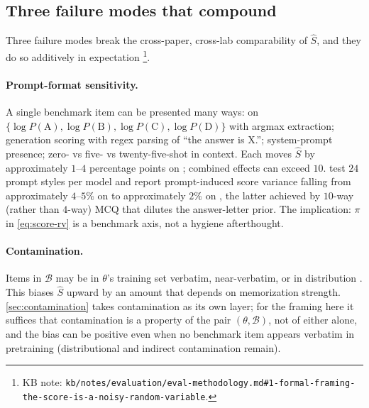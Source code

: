 \subsection{Three failure modes that compound}
\label{sec:measuring-failure-modes}

Three failure modes break the cross-paper, cross-lab comparability of
$\hat{S}$, and they do so additively in expectation%
\footnote{KB note: \texttt{kb/notes/evaluation/eval-methodology.md\#1-formal-framing-the-score-is-a-noisy-random-variable}.}.

\paragraph{Prompt-format sensitivity.} A single benchmark item can be
presented many ways:  on
$\{\log P(\text{A}), \log P(\text{B}), \log P(\text{C}), \log P(\text{D})\}$
with argmax extraction; generation scoring with regex parsing of
``the answer is X.''; system-prompt presence; zero- vs five- vs
twenty-five-shot in context. Each moves $\hat{S}$ by approximately
$1$--$4$ percentage points on ; combined effects can exceed $10$.
\citet{wang2024-mmlu-pro} test $24$ prompt styles per model and report
prompt-induced score variance falling from approximately $4$--$5\%$ on
 to approximately $2\%$ on 
\citep[\S{}abstract]{wang2024-mmlu-pro}, the latter achieved by
$10$-way (rather than $4$-way) MCQ that dilutes the answer-letter
prior. The implication: $\pi$ in \eqref{eq:score-rv} is a benchmark
axis, not a hygiene afterthought.

\paragraph{Contamination.} Items in $\mathcal{B}$ may be in $\theta$'s
training set verbatim, near-verbatim, or in distribution
\citep{contamination-survey-2025}. This biases $\hat{S}$ upward by an
amount that depends on memorization strength. \cref{sec:contamination}
takes contamination as its own layer; for the framing here it
suffices that contamination is a property of the pair
$(\theta, \mathcal{B})$, not of either alone, and the bias can be
positive even when no benchmark item appears verbatim in pretraining
(distributional and indirect contamination remain).

